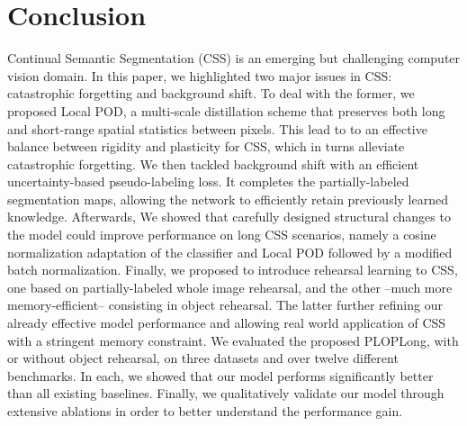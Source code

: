 \section{Conclusion}
\label{sec:seg_conclusion}

Continual Semantic Segmentation (\ac{CSS}) is an emerging but challenging computer vision domain. In this
paper, we highlighted two major issues in \ac{CSS}: catastrophic forgetting and background shift. To deal
with the former, we proposed Local POD, a multi-scale distillation scheme that preserves both long
and short-range spatial statistics between pixels. This lead to to an effective balance between
rigidity and plasticity for \ac{CSS}, which in turns alleviate catastrophic forgetting. We then tackled
background shift with an efficient uncertainty-based pseudo-labeling loss. It completes the
partially-labeled segmentation maps, allowing the network to efficiently retain previously learned
knowledge. Afterwards, We showed that carefully designed structural changes to the model could
improve performance on long \ac{CSS} scenarios, namely a cosine normalization adaptation of the
classifier and Local POD followed by a modified batch normalization. Finally, we proposed to
introduce rehearsal learning to \ac{CSS}, one based on partially-labeled whole image rehearsal, and the
other --much more memory-efficient-- consisting in object rehearsal. The latter further refining our
already effective model performance and allowing real world application of \ac{CSS} with a stringent
memory constraint. We evaluated the proposed PLOPLong, with or without object rehearsal, on three
datasets and over twelve different benchmarks. In each, we showed that our model performs
significantly better than all existing baselines. Finally, we qualitatively validate our model
through extensive ablations in order to better understand the performance gain.
